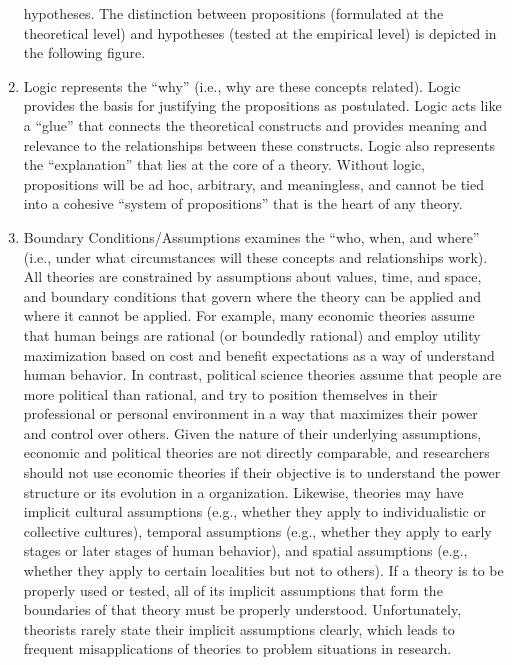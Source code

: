 \documentclass[]{book}
\theoremstyle{definition}
\theoremstyle{definition}
\theoremstyle{definition}
\theoremstyle{remark}
\begin{document}
\begin{enumerate}
  hypotheses. The distinction between propositions (formulated at the
  theoretical level) and hypotheses (tested at the empirical level) is
  depicted in the following figure.
\item
  Logic represents the ``why'' (i.e., why are these concepts related).
  Logic provides the basis for justifying the propositions as
  postulated. Logic acts like a ``glue'' that connects the theoretical
  constructs and provides meaning and relevance to the relationships
  between these constructs. Logic also represents the ``explanation''
  that lies at the core of a theory. Without logic, propositions will be
  ad hoc, arbitrary, and meaningless, and cannot be tied into a cohesive
  ``system of propositions'' that is the heart of any theory.
\item
  Boundary Conditions/Assumptions examines the ``who, when, and where''
  (i.e., under what circumstances will these concepts and relationships
  work). All theories are constrained by assumptions about values, time,
  and space, and boundary conditions that govern where the theory can be
  applied and where it cannot be applied. For example, many economic
  theories assume that human beings are rational (or boundedly rational)
  and employ utility maximization based on cost and benefit expectations
  as a way of understand human behavior. In contrast, political science
  theories assume that people are more political than rational, and try
  to position themselves in their professional or personal environment
  in a way that maximizes their power and control over others. Given the
  nature of their underlying assumptions, economic and political
  theories are not directly comparable, and researchers should not use
  economic theories if their objective is to understand the power
  structure or its evolution in a organization. Likewise, theories may
  have implicit cultural assumptions (e.g., whether they apply to
  individualistic or collective cultures), temporal assumptions (e.g.,
  whether they apply to early stages or later stages of human behavior),
  and spatial assumptions (e.g., whether they apply to certain
  localities but not to others). If a theory is to be properly used or
  tested, all of its implicit assumptions that form the boundaries of
  that theory must be properly understood. Unfortunately, theorists
  rarely state their implicit assumptions clearly, which leads to
  frequent misapplications of theories to problem situations in
  research.
\end{enumerate}
\end{document}
